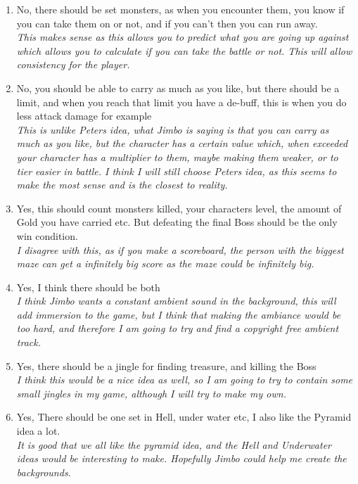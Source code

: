 \documentclass[12pt]{article}
\begin{document}
\begin{enumerate}
	\item{No, there should be set monsters, as when you encounter them, you know if you can take them on or not, and if you can't then you can run away. \\}
	\em{This makes sense as this allows you to predict what you are going up against which allows you to calculate if you can take the battle or not. This will allow consistency for the player.}

	\item{No, you should be able to carry as much as you like, but there should be a limit, and when you reach that limit you have a de-buff, this is when you do less attack damage for example \\}
	\em{This is unlike Peters idea, what Jimbo is saying is that you can carry as much as you like, but the character has a certain value which, when exceeded your character has a multiplier to them, maybe making them weaker, or to tier easier in battle. I think I will still choose Peters idea, as this seems to make the most sense and is the closest to reality.}

	\item{Yes, this should count monsters killed, your characters level, the amount of Gold you have carried etc. But defeating the final Boss should be the only win condition. \\}
	\em{I disagree with this, as if you make a scoreboard, the person with the biggest maze can get a infinitely big score as the maze could be infinitely big.}

	\item{Yes, I think there should be both \\}
	\em{I think Jimbo wants a constant ambient sound in the background, this will add immersion to the game, but I think that making the ambiance would be too hard, and therefore I am going to try and find a copyright free ambient track.}

	\item{Yes, there should be a jingle for finding treasure, and killing the Boss \\}
	\em{I think this would be a nice idea as well, so I am going to try to contain some small jingles in my game, although I will try to make my own.}

	\item{Yes, There should be one set in Hell, under water etc, I also like the Pyramid idea a lot. \\}
	\em{It is good that we all like the pyramid idea, and the Hell and Underwater ideas would be interesting to make. Hopefully Jimbo could help me create the backgrounds.}


\end{enumerate}
\end{document}
